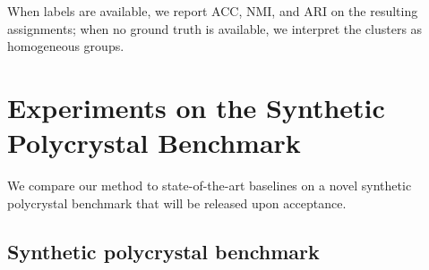 \documentclass[runningheads]{llncs}
\begin{document}
When labels are available, we report ACC, NMI, and ARI on the resulting assignments; when no ground truth is available, we interpret the clusters as homogeneous groups.

\section{Experiments on the Synthetic Polycrystal Benchmark}
\label{sec:experiments}

We compare our method to state-of-the-art baselines on a novel synthetic polycrystal benchmark that will be released upon acceptance.

\subsection{Synthetic polycrystal benchmark}
\label{sec:synth_dataset}
\end{document}
